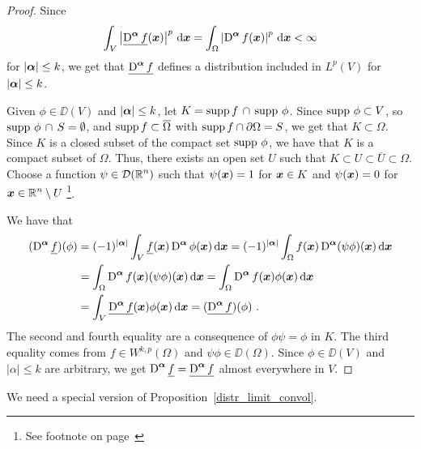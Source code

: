 \begin{proof}
Since
\[
\int_V \left|\underline{\operatorname{D}^{{\bm{\alpha}}} f}({\bm{x}})\right|^p \,\mathrm{d}{{\bm{x}}} = 
\int_{\Omega} \left| \operatorname{D}^{{\bm{\alpha}}} f({\bm{x}}) \right|^p \,\mathrm{d}{{\bm{x}}}
< \infty
\]
for $|{\bm{\alpha}}|\leq k$, we get that
$\displaystyle \underline{\operatorname{D}^{{\bm{\alpha}}} f}$ defines a
distribution included in $\displaystyle L^p(V)$ for $|{\bm{\alpha}}|\leq k$.

Given $\phi \in \DD(V)$ and $|{\bm{\alpha}}|\leq k$, let
$K = \operatorname{supp} f\, \cap\, \operatorname{supp}\, \phi$.  Since $\operatorname{supp}\, \phi \subset V$, so
$\operatorname{supp}\, \phi\, \cap\, S = \emptyset$, and
$\operatorname{supp} f \subset \overline{\Omega}$ with  
$\operatorname{supp} f \cap \partial \Omega = S$, we get that $K \subset \Omega$.
Since $K$ is a closed subset of the compact set $\operatorname{supp}\, \phi$, we have
that $K$ is a compact subset of $\Omega$.  Thus, there exists an open
set $U$ such that $K \subset U \subset \overline{U} \subset \Omega$.
Choose a function $\displaystyle \psi \in \mathcal{D}(\mathbb{R}^n)$ such that
$\psi({\bm{x}}) = 1$ for ${\bm{x}} \in K$ and
$\psi({\bm{x}}) = 0$ for
$\displaystyle {\bm{x}} \in \mathbb{R}^n \setminus U$ \footnote{See
footnote on page~\pageref{FOOTNOTE1}}.

We have that
\begin{align*}
(\operatorname{D}^{{\bm{\alpha}}} \underline{f})(\phi)
&= (-1)^{|{\bm{\alpha}}|} \int_V \underline{f}({\bm{x}})
\operatorname{D}^{{\bm{\alpha}}} \phi({\bm{x}})\,\mathrm{d}{{\bm{x}}}
= (-1)^{|{\bm{\alpha}}|} \int_{\Omega} f({\bm{x}})
\operatorname{D}^{{\bm{\alpha}}} (\psi \phi)({\bm{x}})\,\mathrm{d}{{\bm{x}}} \\
&= \int_{\Omega} \operatorname{D}^{{\bm{\alpha}}} f({\bm{x}}) (\psi \phi)({\bm{x}})\,\mathrm{d}{{\bm{x}}}
= \int_{\Omega} \operatorname{D}^{{\bm{\alpha}}} f({\bm{x}}) \phi({\bm{x}})\,\mathrm{d}{{\bm{x}}} \\
&= \int_V \underline{\operatorname{D}^{{\bm{\alpha}}} f}({\bm{x}}) \phi({\bm{x}})\,\mathrm{d}{{\bm{x}}}
= (\underline{\operatorname{D}^{{\bm{\alpha}}} f}) (\phi) \ .
\end{align*}
The second and fourth equality are a
consequence of $\phi \psi = \phi$ in $K$.  The third equality comes
from $\displaystyle f \in W^{k,p}(\Omega)$ and $\psi \phi \in \DD(\Omega)$.
Since $\phi \in \DD(V)$ and $|\alpha|\leq k$ are arbitrary,
we get $\displaystyle \operatorname{D}^{{\bm{\alpha}}} \underline{f}
= \underline{\operatorname{D}^{{\bm{\alpha}}} f}$
almost everywhere in $V$.
\end{proof}

We need a special version of Proposition~\ref{distr_limit_convol}.


